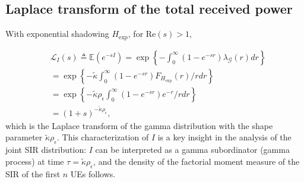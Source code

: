\documentclass[lettersize,journal]{IEEEtran}
\begin{document}



\subsection{Laplace transform of the total received power}

With exponential shadowing ${H}_{\text{exp}}$, for Re$(s)>1$,

\begin{align}
  \label{eq:lapdef}
  &\mathcal{L}_{I}(s)\triangleq \mathbb{E}\left(e^{-sI}\right)= \exp\left\{-\int_0^{\infty}(1-e^{-sr}) \lambda_{\mathcal{G}}(r) dr \right\} \nonumber \\
  &=\exp\left\{-\tilde{\kappa}\int_0^{\infty}(1-e^{-sr}) F_{{H}_{\text{exp}}}(r) /r dr \right\} \nonumber \\
  &=\exp\left\{-\tilde{\kappa}\rho_{\epsilon}\int_0^{\infty}(1-e^{-sr}) e^{-r} /r dr \right\} \nonumber \\
  &=(1+s)^{-\tilde{\kappa}\rho_{\epsilon}},
\end{align}
which is the Laplace transform of the gamma distribution with the shape parameter $\tilde{\kappa}\rho_{\epsilon}$. This characterization of $I$ is a key insight in the analysis of the joint SIR distribution: $I$ can be interpreted as a gamma subordinator (gamma process) at time $\tau=\tilde{\kappa} \rho_{\epsilon}$, and the density of the factorial moment measure of the SIR of the first $n$ UEs follows.
\end{document}
